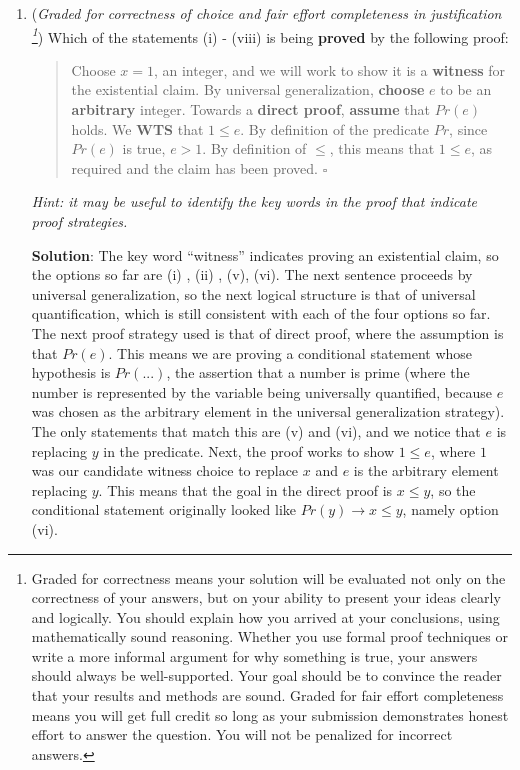 \begin{enumerate}
\begin{enumerate}
   \item ({\it Graded for correctness of choice and fair effort completeness in justification
   \footnote{Graded for correctness means your solution will be
   evaluated not only on the correctness of your answers, but on your ability to 
   present your ideas clearly and logically. You should explain how you arrived at your conclusions, using 
   mathematically sound reasoning. Whether you use formal proof techniques or write a more informal argument for why 
   something is true, your answers should always be well-supported. Your goal should be to convince the reader that 
   your results and methods are sound. Graded for fair effort completeness means 
   you will get full credit so long as your submission demonstrates honest 
   effort to answer the question. You will not be penalized for incorrect answers.}}) 
   Which of the statements (i) - (viii) is being {\bf proved} by the following proof:
   \begin{quote}
     Choose $x = 1$, an integer, and we will work to show
     it is a {\bf witness} for the existential claim. By universal generalization, {\bf choose} $e$ to be an {\bf arbitrary} integer. 
     Towards a {\bf direct proof}, {\bf assume} that $Pr(e)$ holds. We {\bf WTS} that $1 \leq e$.
     By definition of the  predicate $Pr$, since $Pr(e)$ is true, $e > 1$. By definition of $\leq$, 
     this means that $1 \leq e$, as required and the claim has been proved. $\square$
   \end{quote}
   
   
   {\it Hint: it may be useful to 
   identify the key words in the proof that indicate proof strategies.}
   
  {\bf Solution}:  The key word ``witness'' indicates proving an existential claim,
  so the options so far are (i) , (ii) , (v), (vi). The next
  sentence proceeds by universal generalization, so the next logical structure
  is that of universal quantification, which is still consistent with each of the 
  four options so far. The next proof strategy used is that of direct proof, where 
  the assumption is that $Pr(e)$. This means we are proving a conditional statement
  whose hypothesis is $Pr(...)$, the assertion that a number is prime (where the number
  is represented by the variable being universally quantified, because $e$ was 
  chosen as the arbitrary element in the universal generalization strategy).
  The only statements that match this are (v) and (vi), and we notice
  that $e$ is replacing $y$ in the predicate. Next, the proof
  works to show $1 \leq e$, where $1$ was our candidate witness choice to replace 
  $x$ and $e$ is the arbitrary element replacing $y$. This means that the goal 
  in the direct proof is $x \leq y$, so the conditional statement originally looked
  like $Pr(y) \to x \leq y$, namely option (vi).


\end{enumerate}
\end{enumerate}
